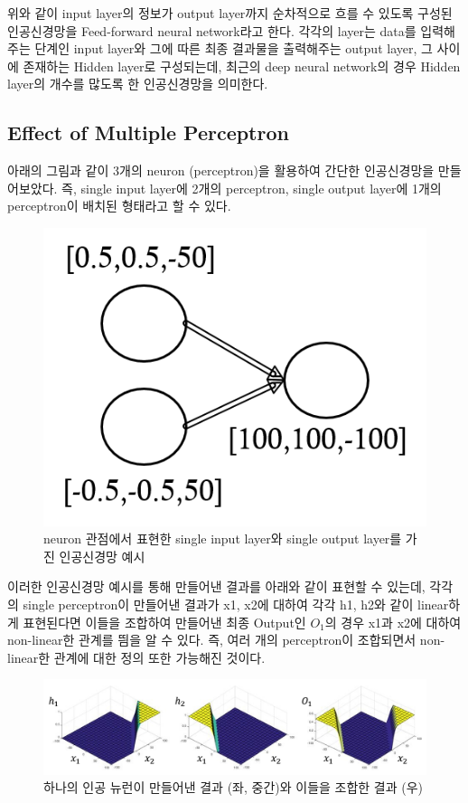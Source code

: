 \documentclass[draft=false]{oblivoir}
\begin{document}
위와 같이 input layer의 정보가 output layer까지 순차적으로 흐를 수 있도록 구성된 인공신경망을 Feed-forward neural network라고 한다. 각각의 layer는 data를 입력해주는 단계인 input layer와 그에 따른 최종 결과물을 출력해주는 output layer, 그 사이에 존재하는 Hidden layer로 구성되는데, 최근의 deep neural network의 경우 Hidden layer의 개수를 많도록 한 인공신경망을 의미한다. 
\subsection{Effect of Multiple Perceptron}
아래의 그림과 같이 3개의 neuron (perceptron)을 활용하여 간단한 인공신경망을 만들어보았다. 즉, single input layer에 2개의 perceptron, single output layer에 1개의 perceptron이 배치된 형태라고 할 수 있다. 
\begin{figure}[ht] \centering 
\includegraphics[scale=0.5]{fig14_15.png} 
\caption{neuron 관점에서 표현한 single input layer와 single output layer를 가진 인공신경망 예시}
\label{fig:14-15}
\end{figure}
이러한 인공신경망 예시를 통해 만들어낸 결과를 아래와 같이 표현할 수 있는데, 각각의 single perceptron이 만들어낸 결과가 x1, x2에 대하여 각각 h1, h2와 같이 linear하게 표현된다면 이들을 조합하여 만들어낸 최종 Output인 $O_{1}$의 경우 x1과 x2에 대하여 non-linear한 관계를 띔을 알 수 있다. 즉, 여러 개의 perceptron이 조합되면서 non-linear한 관계에 대한 정의 또한 가능해진 것이다. 
\begin{figure}[ht] \centering 
\includegraphics[scale=0.5]{fig14_16.png} 
\caption{하나의 인공 뉴런이 만들어낸 결과 (좌, 중간)와 이들을 조합한 결과 (우)}
\label{fig:14-16}
\end{figure}
\newpage
\end{document}
